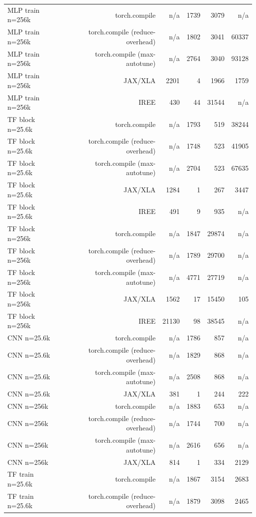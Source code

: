 \begin{tabular}{lrrrrr}
MLP train n=256k & torch.compile & n/a & 1739 & 3079 & n/a \\
MLP train n=256k & torch.compile (reduce-overhead) & n/a & 1802 & 3041 & 60337 \\
MLP train n=256k & torch.compile (max-autotune) & n/a & 2764 & 3040 & 93128 \\
MLP train n=256k & JAX/XLA & 2201 & 4 & 1966 & 1759 \\
MLP train n=256k & IREE & 430 & 44 & 31544 & n/a \\
TF block n=25.6k & torch.compile & n/a & 1793 & 519 & 38244 \\
TF block n=25.6k & torch.compile (reduce-overhead) & n/a & 1748 & 523 & 41905 \\
TF block n=25.6k & torch.compile (max-autotune) & n/a & 2704 & 523 & 67635 \\
TF block n=25.6k & JAX/XLA & 1284 & 1 & 267 & 3447 \\
TF block n=25.6k & IREE & 491 & 9 & 935 & n/a \\
TF block n=256k & torch.compile & n/a & 1847 & 29874 & n/a \\
TF block n=256k & torch.compile (reduce-overhead) & n/a & 1789 & 29700 & n/a \\
TF block n=256k & torch.compile (max-autotune) & n/a & 4771 & 27719 & n/a \\
TF block n=256k & JAX/XLA & 1562 & 17 & 15450 & 105 \\
TF block n=256k & IREE & 21130 & 98 & 38545 & n/a \\
CNN n=25.6k & torch.compile & n/a & 1786 & 857 & n/a \\
CNN n=25.6k & torch.compile (reduce-overhead) & n/a & 1829 & 868 & n/a \\
CNN n=25.6k & torch.compile (max-autotune) & n/a & 2508 & 868 & n/a \\
CNN n=25.6k & JAX/XLA & 381 & 1 & 244 & 222 \\
CNN n=256k & torch.compile & n/a & 1883 & 653 & n/a \\
CNN n=256k & torch.compile (reduce-overhead) & n/a & 1744 & 700 & n/a \\
CNN n=256k & torch.compile (max-autotune) & n/a & 2616 & 656 & n/a \\
CNN n=256k & JAX/XLA & 814 & 1 & 334 & 2129 \\
TF train n=25.6k & torch.compile & n/a & 1867 & 3154 & 2683 \\
TF train n=25.6k & torch.compile (reduce-overhead) & n/a & 1879 & 3098 & 2465 \\

\end{tabular}
